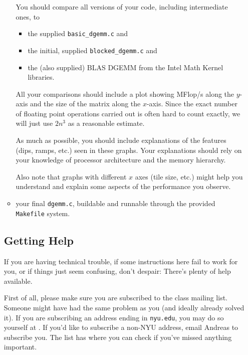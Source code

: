 \documentclass[11pt]{article}
\begin{document}
\begin{enumerate}
\begin{itemize}
  You should compare all versions of your code, including intermediate
  ones, to
  \begin{itemize}
    \item the supplied \verb|basic_dgemm.c| and
    \item the initial, supplied \verb|blocked_dgemm.c| and
    \item the (also supplied) BLAS DGEMM from the
      Intel Math Kernel libraries.
  \end{itemize}

  All your comparisons should include a plot showing MFlop/s along the
  $y$-axis and the size of the matrix along the $x$-axis. Since the
  exact number of floating point operations carried out is often hard
  to count exactly, we will just use $2n^3$ as a reasonable estimate.

  As much as possible, you should include explanations of the features
  (dips, ramps, etc.) seen in these graphs. Your explanations should
  rely on your knowledge of processor architecture and the memory
  hierarchy.

  Also note that graphs with different $x$ axes (tile size, etc.)
  might help you understand and explain some aspects of the
  performance you observe.

  \item your final \verb|dgemm.c|, buildable and runnable through the
  provided \texttt{Makefile} system.
\end{itemize}





\clearpage


\subsection*{Getting Help}

If you are having technical trouble, if some instructions here fail to
work for you, or if things just seem confusing, don't despair: There's
plenty of help available.

First of all, please make sure you are subscribed to the class mailing
list. Someone might have had the same problem as you (and ideally
already solved it).  If you are subscribing an address ending in
\texttt{nyu.edu}, you may do so yourself at
. If you'd like to subscribe a non-NYU address, email
Andreas to subscribe you. The list has
where you can check if you've missed anything important.


\end{enumerate}
\end{document}
